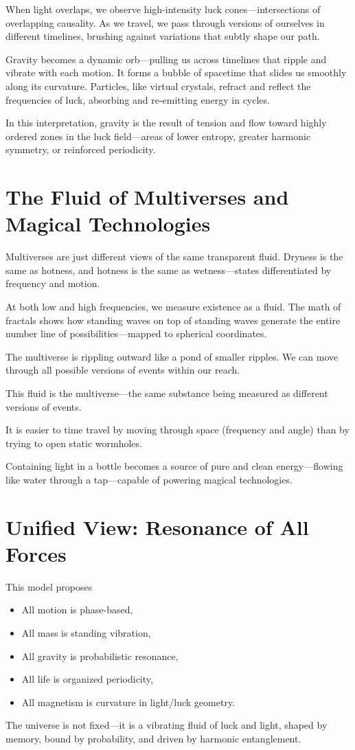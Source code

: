 \documentclass[12pt]{article}
\begin{document}
When light overlaps, we observe high-intensity luck cones---intersections of overlapping causality. As we travel, we pass through versions of ourselves in different timelines, brushing against variations that subtly shape our path.

Gravity becomes a dynamic orb---pulling us across timelines that ripple and vibrate with each motion. It forms a bubble of spacetime that slides us smoothly along its curvature. Particles, like virtual crystals, refract and reflect the frequencies of luck, absorbing and re-emitting energy in cycles.

In this interpretation, gravity is the result of tension and flow toward highly ordered zones in the luck field---areas of lower entropy, greater harmonic symmetry, or reinforced periodicity.

\section{The Fluid of Multiverses and Magical Technologies}
Multiverses are just different views of the same transparent fluid. Dryness is the same as hotness, and hotness is the same as wetness---states differentiated by frequency and motion.

At both low and high frequencies, we measure existence as a fluid. The math of fractals shows how standing waves on top of standing waves generate the entire number line of possibilities---mapped to spherical coordinates.

The multiverse is rippling outward like a pond of smaller ripples. We can move through all possible versions of events within our reach.

This fluid is the multiverse---the same substance being measured as different versions of events.

It is easier to time travel by moving through space (frequency and angle) than by trying to open static wormholes.

Containing light in a bottle becomes a source of pure and clean energy---flowing like water through a tap---capable of powering magical technologies.

\section{Unified View: Resonance of All Forces}
This model proposes
\begin{itemize}
    \item All motion is phase-based,
    \item All mass is standing vibration,
    \item All gravity is probabilistic resonance,
    \item All life is organized periodicity,
    \item All magnetism is curvature in light/luck geometry.
\end{itemize}
The universe is not fixed---it is a vibrating fluid of luck and light, shaped by memory, bound by probability, and driven by harmonic entanglement.
\end{document}

